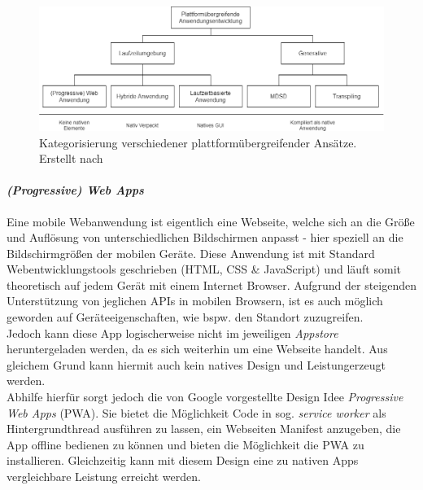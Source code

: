 \begin{figure}[h]
	\begin{center}
		\includegraphics[scale=0.47]{Theoretische_Grundlagen/images/crossplattform_unterteilung.png}
	\end{center}
	\caption{Kategorisierung verschiedener plattformübergreifender Ansätze. Erstellt nach \cite{majchrzak2015} \protect}
	\label{fig:crossplattform_architecture}
\end{figure}

\paragraph{\textit{(Progressive) Web Apps}}
Eine mobile Webanwendung ist eigentlich eine Webseite, welche sich an die Größe und Auflösung von unterschiedlichen Bildschirmen anpasst - hier speziell an die Bildschirmgrößen der mobilen Geräte. Diese Anwendung ist mit Standard Webentwicklungstools geschrieben (HTML, CSS \& JavaScript) und läuft somit theoretisch auf jedem Gerät mit einem Internet Browser. \cite{charland2011}
Aufgrund der steigenden Unterstützung von jeglichen APIs in mobilen Browsern, ist es auch möglich geworden auf Geräteeigenschaften, wie bspw. den Standort zuzugreifen.\\
Jedoch kann diese App logischerweise nicht im jeweiligen \textit{Appstore} heruntergeladen werden, da es sich weiterhin um eine Webseite handelt.
Aus gleichem Grund kann hiermit auch kein \glqq natives Design und Leistung\grqq erzeugt werden.\\

Abhilfe hierfür sorgt jedoch die von Google vorgestellte Design Idee \textit{Progressive Web Apps} (PWA). Sie bietet die Möglichkeit Code in sog. \textit{service worker} als Hintergrundthread ausführen zu lassen, ein Webseiten Manifest anzugeben, die App offline bedienen zu können und bieten die Möglichkeit die PWA zu installieren. Gleichzeitig kann mit diesem Design eine zu nativen Apps vergleichbare Leistung erreicht werden.\cite{bjorn-hansen2020} \\

